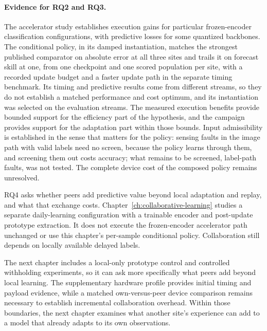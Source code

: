 \paragraph{Evidence for RQ2 and RQ3.} The accelerator study establishes execution gains for particular frozen-encoder classification configurations, with predictive losses for some quantized backbones. The conditional policy, in its damped instantiation, matches the strongest published comparator on absolute error at all three sites and trails it on forecast skill at one, from one checkpoint and one scored population per site, with a recorded update budget and a faster update path in the separate timing benchmark. Its timing and predictive results come from different streams, so they do not establish a matched performance and cost optimum, and its instantiation was selected on the evaluation streams. The measured execution benefits provide bounded support for the efficiency part of the hypothesis, and the campaign provides support for the adaptation part within those bounds. Input admissibility is established in the sense that matters for the policy: sensing faults in the image path with valid labels need no screen, because the policy learns through them, and screening them out costs accuracy; what remains to be screened, label-path faults, was not tested. The complete device cost of the composed policy remains unresolved.

RQ4 asks whether peers add predictive value beyond local adaptation and replay, and what that exchange costs. Chapter~\ref{ch:collaborative-learning} studies a separate daily-learning configuration with a trainable encoder and post-update prototype extraction. It does not execute the frozen-encoder accelerator path unchanged or use this chapter's per-sample conditional policy. Collaboration still depends on locally available delayed labels.

The next chapter includes a local-only prototype control and controlled withholding experiments, so it can ask more specifically what peers add beyond local learning. The supplementary hardware profile provides initial timing and payload evidence, while a matched own-versus-peer device comparison remains necessary to establish incremental collaboration overhead. Within those boundaries, the next chapter examines what another site's experience can add to a model that already adapts to its own observations.

